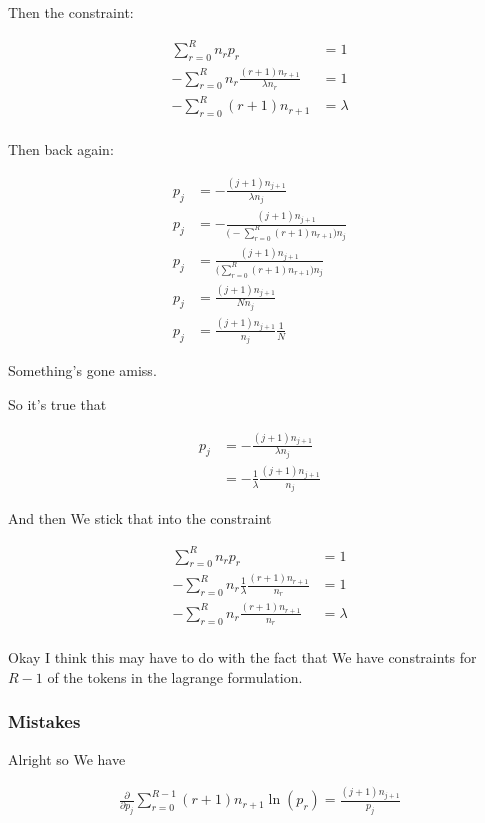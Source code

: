 \documentclass{article}
\begin{document}
		Then the constraint:
		
		\begin{align}
			\sum^R_{r=0} n_r p_r &= 1\\
			-\sum^R_{r=0} n_r \frac{(r+1)n_{r+1}}{\lambda n_r} &= 1\\
			-\sum^R_{r=0}  (r+1)n_{r+1} &= \lambda \\
		\end{align}
		
		Then back again:
		
		\begin{align}
			p_j  &= - \frac{(j+1)n_{j+1}}{\lambda n_j}\\
			p_j  &= - \frac{(j+1)n_{j+1}}{\bigg( -\sum^R_{r=0}  (r+1)n_{r+1} \bigg) n_j}\\
			p_j  &= \frac{(j+1)n_{j+1}}{\bigg(\sum^R_{r=0}  (r+1)n_{r+1} \bigg) n_j}\\
			p_j  &= \frac{(j+1)n_{j+1}}{N n_j}\\
			p_j  &= \frac{(j+1)n_{j+1}}{n_j}\frac{1}{N }
		\end{align}
		
		
		Something's gone amiss.
		
		So it's true that 
		
		\begin{align}
			p_j  &= - \frac{(j+1)n_{j+1}}{\lambda n_j}\\
			&= - \frac{1}{\lambda}\frac{(j+1)n_{j+1}}{n_j}
		\end{align}
		
		And then We stick that into the constraint
		
		\begin{align}
			\sum^R_{r=0} n_r p_r &= 1\\
			-\sum^R_{r=0} n_r \frac{1}{\lambda}\frac{(r+1)n_{r+1}}{n_r} &= 1\\
			-\sum^R_{r=0} n_r \frac{(r+1)n_{r+1}}{n_r} &= \lambda\\
		\end{align}
		
		Okay I think this may have to do with the fact that We have constraints for $R-1$ of the tokens in the lagrange formulation.
		
		\subsubsection{Mistakes}
		
			Alright so We have 
		
			\begin{align}
				\frac{\partial}{\partial p_j} \sum_{r=0}^{R-1} (r+1)n_{r+1}\ln(p_r) = \frac{(j+1)n_{j+1}}{p_j}
			\end{align}
			
\end{document}
